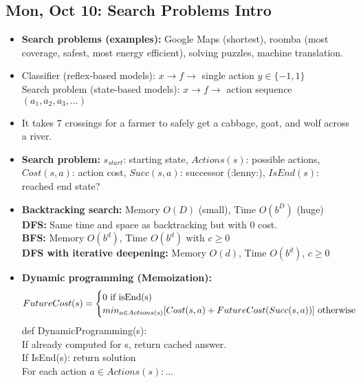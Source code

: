\documentclass[10pt, oneside]{article}
\begin{document}
\subsection{Mon, Oct 10: Search Problems Intro}

\begin{itemize}

\item \textbf{Search problems (examples):} Google Maps (shortest), roomba (most coverage, safest, most energy efficient), solving puzzles, machine translation.

\item Classifier (reflex-based models): $x \to f \to$ single action $y \in \{-1, 1\}$\\
Search problem (state-based models): $x \to f \to$ action sequence $(a_1, a_2, a_3,...)$

\item It takes 7 crossings for a farmer to safely get a cabbage, goat, and wolf across a river.

\item \textbf{Search problem:} $s_{start}$: starting state, $Actions(s)$: possible actions, $Cost(s,a)$: action cost, $Succ(s,a)$: successor (:lenny:), $IsEnd(s)$: reached end state?

\item \textbf{Backtracking search:} Memory $O(D)$ (small), Time $O(b^D)$ (huge)\\
\textbf{DFS:} Same time and space as backtracking but with 0 cost.\\
\textbf{BFS:} Memory $O(b^d)$, Time $O(b^d)$ with $c \geq 0$\\
\textbf{DFS with iterative deepening:} Memory $O(d)$, Time $O(b^d)$, $c \geq 0$

\item \textbf{Dynamic programming (Memoization):} \[ FutureCost(s) = \begin{cases} 
      0 \text{ if isEnd(s)}\\
      min_{a\in Actions(s)}[Cost(s,a) + FutureCost(Succ(s,a))] \text{ otherwise}
   \end{cases}\\
\]
  def DynamicProgramming(s):\\
   If already computed for s, return cached answer.\\
   If IsEnd(s): return solution\\
   For each action $a \in Actions(s):$...\\


\end{itemize}
\end{document}
